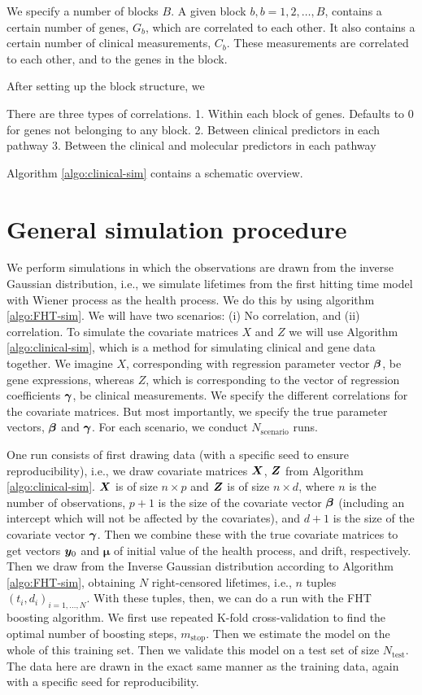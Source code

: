 We specify a number of blocks $B$. A given block $b,b=1,2,\ldots,B$, contains a certain number of genes, $G_b$, which are correlated to each other.
It also contains a certain number of clinical measurements, $C_b$. These measurements are correlated to each other, and to the genes in the block.

After setting up the block structure, we 

There are three types of correlations.
1. Within each block of genes. Defaults to 0 for genes not belonging to any block.
2. Between clinical predictors in each pathway
3. Between the clinical and molecular predictors in each pathway

Algorithm \ref{algo:clinical-sim} contains a schematic overview.


\section{General simulation procedure}
We perform simulations in which the observations are drawn from the inverse Gaussian distribution, i.e., we simulate lifetimes from the first hitting time model with Wiener process as the health process.
We do this by using algorithm \ref{algo:FHT-sim}.
We will have two scenarios:
(i) No correlation, and (ii) correlation.
To simulate the covariate matrices $X$ and $Z$ we will use Algorithm \ref{algo:clinical-sim}, which is a method for simulating clinical and gene data together.
We imagine $X$, corresponding with regression parameter vector $\boldsymbol{\beta}$, be gene expressions, whereas $Z$, which is corresponding to the vector of regression coefficients $\boldsymbol{\gamma}$, be clinical measurements.
We specify the different correlations for the covariate matrices.
But most importantly, we specify the true parameter vectors, $\boldsymbol{\beta}$ and $\boldsymbol{\gamma}$.
For each scenario, we conduct $N_{\text{scenario}}$ runs.

One run consists of first drawing data (with a specific seed to ensure reproducibility), i.e., we draw covariate matrices $\bm{X}$, $\bm{Z}$ from Algorithm \ref{algo:clinical-sim}.
$\bm{X}$ is of size $n\times p$ and $\bm{Z}$ is of size $n\times d$, where $n$ is the number of observations, $p+1$ is the size of the covariate vector $\boldsymbol{\beta}$ (including an intercept which will not be affected by the covariates), and $d+1$ is the size of the covariate vector $\boldsymbol{\gamma}$.
Then we combine these with the true covariate matrices to get vectors $\bm{y}_0$ and $\mathbf{\mu}$ of initial value of the health process, and drift, respectively.
Then we draw from the Inverse Gaussian distribution according to Algorithm \ref{algo:FHT-sim}, obtaining $N$ right-censored lifetimes, i.e., $n$ tuples $(t_i,d_i)_{i=1,\ldots,N}$.
With these tuples, then, we can do a run with the FHT boosting algorithm. We first use repeated K-fold cross-validation to find the optimal number of boosting steps, $m_{\text{stop}}$.
Then we estimate the model on the whole of this training set.
Then we validate this model on a test set of size $N_{\text{test}}$.
The data here are drawn in the exact same manner as the training data, again with a specific seed for reproducibility.

